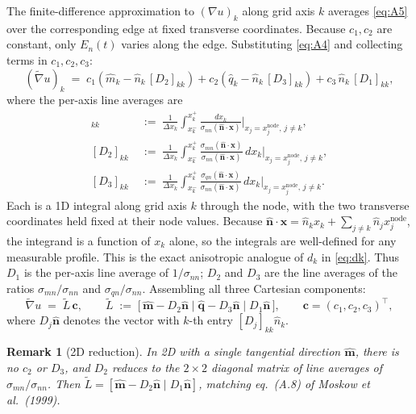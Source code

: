 \documentclass[11pt]{article}
\newtheorem{remark}{Remark}
\newcommand{\nn}{\hat{\bm{n}}}
\newcommand{\mm}{\hat{\bm{m}}}
\newcommand{\qq}{\hat{\bm{q}}}
\newcommand{\tL}{\widetilde{L}}
\newcommand{\tvnabla}{\widetilde{\nabla}}
\begin{document}
The finite-difference approximation to $(\nabla u)_k$ along grid axis $k$
averages \eqref{eq:A5} over the corresponding edge at fixed transverse
coordinates.  Because $c_1,c_2$ are constant, only $E_n(t)$ varies along
the edge.  Substituting \eqref{eq:A4} and collecting terms in $c_1,c_2,c_3$:
\begin{equation}\label{eq:A7}
  (\tvnabla u)_k
  \;=\; c_1\!\left(\hat{m}_k - \hat{n}_k\,[D_2]_{kk}\right)
      + c_2\!\left(\hat{q}_k - \hat{n}_k\,[D_3]_{kk}\right)
      + c_3\,\hat{n}_k\,[D_1]_{kk},
\end{equation}
where the per-axis line averages are
\begin{align}
  [D_1]_{kk} &\;:=\;
    \frac{1}{\Delta x_k}\int_{x_k^-}^{x_k^+}
    \frac{dx_k}{\sigma_{nn}(\nn\cdot\bm{x})}\bigg|_{x_j = x_j^{\mathrm{node}},\,j\neq k},
    \label{eq:A8}\\[4pt]
  [D_2]_{kk} &\;:=\;
    \frac{1}{\Delta x_k}\int_{x_k^-}^{x_k^+}
    \frac{\sigma_{mn}(\nn\cdot\bm{x})}{\sigma_{nn}(\nn\cdot\bm{x})}\,dx_k\bigg|_{x_j = x_j^{\mathrm{node}},\,j\neq k},
    \label{eq:A9}\\[4pt]
  [D_3]_{kk} &\;:=\;
    \frac{1}{\Delta x_k}\int_{x_k^-}^{x_k^+}
    \frac{\sigma_{qn}(\nn\cdot\bm{x})}{\sigma_{nn}(\nn\cdot\bm{x})}\,dx_k\bigg|_{x_j = x_j^{\mathrm{node}},\,j\neq k}.
    \label{eq:A10}
\end{align}
Each is a 1D integral along grid axis $k$ through the node, with the two
transverse coordinates held fixed at their node values.  Because
$\nn\cdot\bm{x} = \hat{n}_k x_k + \sum_{j\neq k}\hat{n}_j x_j^{\mathrm{node}}$,
the integrand is a function of $x_k$ alone, so the integrals are
well-defined for any measurable profile.  This is the exact anisotropic
analogue of $d_k$ in \eqref{eq:dk}.  Thus $D_1$ is the per-axis line
average of $1/\sigma_{nn}$; $D_2$ and $D_3$ are the line averages of the
ratios $\sigma_{mn}/\sigma_{nn}$ and $\sigma_{qn}/\sigma_{nn}$.
Assembling all three Cartesian components:
\begin{equation}\label{eq:A11}
  \tvnabla u \;=\; \tL\,\bm{c},
  \qquad
  \tL \;:=\; \bigl[\,\mm - D_2\nn \;\big|\; \qq - D_3\nn \;\big|\; D_1\nn\,\bigr],
  \qquad
  \bm{c} = (c_1, c_2, c_3)^\top,
\end{equation}
where $D_j\nn$ denotes the vector with $k$-th entry $[D_j]_{kk}\hat{n}_k$.

\begin{remark}[2D reduction]
In 2D with a single tangential direction $\mm$, there is no $c_2$ or $D_3$,
and $D_2$ reduces to the $2\times 2$ diagonal matrix of line averages of
$\sigma_{mn}/\sigma_{nn}$.  Then $\tL = [\mm - D_2\nn \mid D_1\nn]$, matching
eq.~(A.8) of Moskow et al.\ (1999).
\end{remark}
\end{document}
